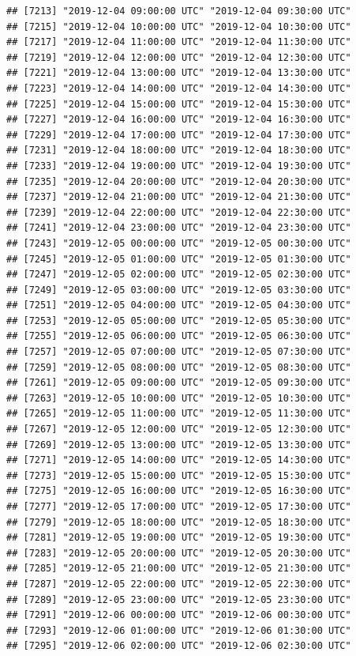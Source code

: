 \documentclass{article}\usepackage[]{graphicx}\usepackage[]{color}
\makeatletter
\newenvironment{kframe}{%
 \def\at@end@of@kframe{}%
 \ifinner\ifhmode%
  \def\at@end@of@kframe{\end{minipage}}%
  \begin{minipage}{\columnwidth}%
 \fi\fi%
 \def\FrameCommand##1{\hskip\@totalleftmargin \hskip-\fboxsep
 \colorbox{shadecolor}{##1}\hskip-\fboxsep
     \hskip-\linewidth \hskip-\@totalleftmargin \hskip\columnwidth}%
 \MakeFramed {\advance\hsize-\width
   \@totalleftmargin\z@ \linewidth\hsize
   \@setminipage}}%
 {\par\unskip\endMakeFramed%
 \at@end@of@kframe}
\newenvironment{knitrout}{}{} %
\makeatother
\begin{document}
\begin{knitrout}
\begin{kframe}
\begin{verbatim}
## [7213] "2019-12-04 09:00:00 UTC" "2019-12-04 09:30:00 UTC"
## [7215] "2019-12-04 10:00:00 UTC" "2019-12-04 10:30:00 UTC"
## [7217] "2019-12-04 11:00:00 UTC" "2019-12-04 11:30:00 UTC"
## [7219] "2019-12-04 12:00:00 UTC" "2019-12-04 12:30:00 UTC"
## [7221] "2019-12-04 13:00:00 UTC" "2019-12-04 13:30:00 UTC"
## [7223] "2019-12-04 14:00:00 UTC" "2019-12-04 14:30:00 UTC"
## [7225] "2019-12-04 15:00:00 UTC" "2019-12-04 15:30:00 UTC"
## [7227] "2019-12-04 16:00:00 UTC" "2019-12-04 16:30:00 UTC"
## [7229] "2019-12-04 17:00:00 UTC" "2019-12-04 17:30:00 UTC"
## [7231] "2019-12-04 18:00:00 UTC" "2019-12-04 18:30:00 UTC"
## [7233] "2019-12-04 19:00:00 UTC" "2019-12-04 19:30:00 UTC"
## [7235] "2019-12-04 20:00:00 UTC" "2019-12-04 20:30:00 UTC"
## [7237] "2019-12-04 21:00:00 UTC" "2019-12-04 21:30:00 UTC"
## [7239] "2019-12-04 22:00:00 UTC" "2019-12-04 22:30:00 UTC"
## [7241] "2019-12-04 23:00:00 UTC" "2019-12-04 23:30:00 UTC"
## [7243] "2019-12-05 00:00:00 UTC" "2019-12-05 00:30:00 UTC"
## [7245] "2019-12-05 01:00:00 UTC" "2019-12-05 01:30:00 UTC"
## [7247] "2019-12-05 02:00:00 UTC" "2019-12-05 02:30:00 UTC"
## [7249] "2019-12-05 03:00:00 UTC" "2019-12-05 03:30:00 UTC"
## [7251] "2019-12-05 04:00:00 UTC" "2019-12-05 04:30:00 UTC"
## [7253] "2019-12-05 05:00:00 UTC" "2019-12-05 05:30:00 UTC"
## [7255] "2019-12-05 06:00:00 UTC" "2019-12-05 06:30:00 UTC"
## [7257] "2019-12-05 07:00:00 UTC" "2019-12-05 07:30:00 UTC"
## [7259] "2019-12-05 08:00:00 UTC" "2019-12-05 08:30:00 UTC"
## [7261] "2019-12-05 09:00:00 UTC" "2019-12-05 09:30:00 UTC"
## [7263] "2019-12-05 10:00:00 UTC" "2019-12-05 10:30:00 UTC"
## [7265] "2019-12-05 11:00:00 UTC" "2019-12-05 11:30:00 UTC"
## [7267] "2019-12-05 12:00:00 UTC" "2019-12-05 12:30:00 UTC"
## [7269] "2019-12-05 13:00:00 UTC" "2019-12-05 13:30:00 UTC"
## [7271] "2019-12-05 14:00:00 UTC" "2019-12-05 14:30:00 UTC"
## [7273] "2019-12-05 15:00:00 UTC" "2019-12-05 15:30:00 UTC"
## [7275] "2019-12-05 16:00:00 UTC" "2019-12-05 16:30:00 UTC"
## [7277] "2019-12-05 17:00:00 UTC" "2019-12-05 17:30:00 UTC"
## [7279] "2019-12-05 18:00:00 UTC" "2019-12-05 18:30:00 UTC"
## [7281] "2019-12-05 19:00:00 UTC" "2019-12-05 19:30:00 UTC"
## [7283] "2019-12-05 20:00:00 UTC" "2019-12-05 20:30:00 UTC"
## [7285] "2019-12-05 21:00:00 UTC" "2019-12-05 21:30:00 UTC"
## [7287] "2019-12-05 22:00:00 UTC" "2019-12-05 22:30:00 UTC"
## [7289] "2019-12-05 23:00:00 UTC" "2019-12-05 23:30:00 UTC"
## [7291] "2019-12-06 00:00:00 UTC" "2019-12-06 00:30:00 UTC"
## [7293] "2019-12-06 01:00:00 UTC" "2019-12-06 01:30:00 UTC"
## [7295] "2019-12-06 02:00:00 UTC" "2019-12-06 02:30:00 UTC"

\end{verbatim}
\end{kframe}
\end{knitrout}
\end{document}

